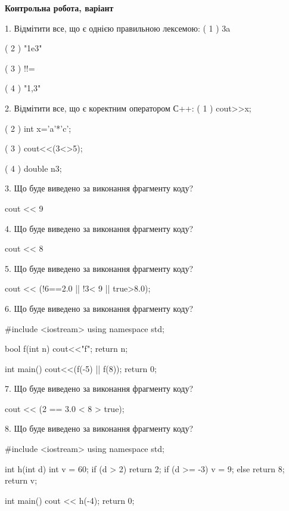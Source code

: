 \documentclass[11pt, ukrainian]{article}
\begin{document}
\begin{large}
\textbf{Контрольна робота, варіант }\par

1. Відмітити все, що є однією правильною лексемою:
( 1 ) 3a

( 2 ) "1e3"

( 3 ) !!=

( 4 ) "1,3"


2. Відмітити все, що є коректним оператором С++:
( 1 ) cout>>x;

( 2 ) int x='a'*'c';

( 3 ) cout<<(3<>5);

( 4 ) {double n3;}


3. Що буде виведено за виконання фрагменту коду?

cout << 9 %


4. Що буде виведено за виконання фрагменту коду?

cout << 8 %


5. Що буде виведено за виконання фрагменту коду?

cout << (!6==2.0 || !3< 9 || true>8.0);


6. Що буде виведено за виконання фрагменту коду?

#include <iostream>
using namespace std;

bool f(int n){
    cout<<"f";
    return n;
}

int main(){
    cout<<(f(-5) || f(8));
    return 0;
}


7. Що буде виведено за виконання фрагменту коду?

cout << (2 == 3.0 < 8 > true);


8. Що буде виведено за виконання фрагменту коду?

#include <iostream>
using namespace std;

int h(int d){
    int v = 60;
    if (d > 2) 
        return 2;
    if (d >= -3)
         v = 9;
    else
         return 8;
    return v;
}

int main(){
    cout << h(-4);
    return 0;
}



\end{large}
\end{document}
